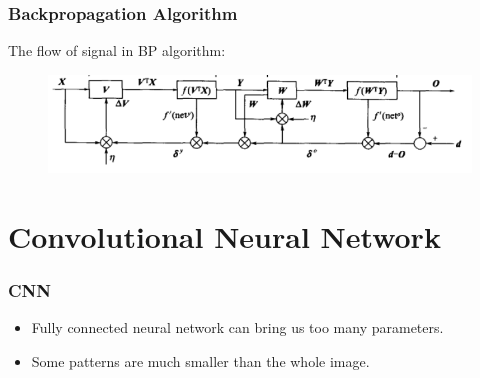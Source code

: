 \documentclass{beamer}
\begin{document}
\begin{frame}
	\frametitle{Backpropagation Algorithm}
	The flow of signal in BP algorithm:
	\begin{figure}
		\includegraphics[width=\linewidth]{bp_flow.png}
	\end{figure}
\end{frame}



\section{Convolutional Neural Network}
\begin{frame}
\frametitle{CNN}
\begin{itemize}
	\item Fully connected neural network can bring us too many parameters.
	\item Some patterns are much smaller than the whole image.
\end{itemize}

\begin{figure}
	\hfill
{}
\hfill
{}
\hfill
\end{figure}

\end{frame}
\end{document}
